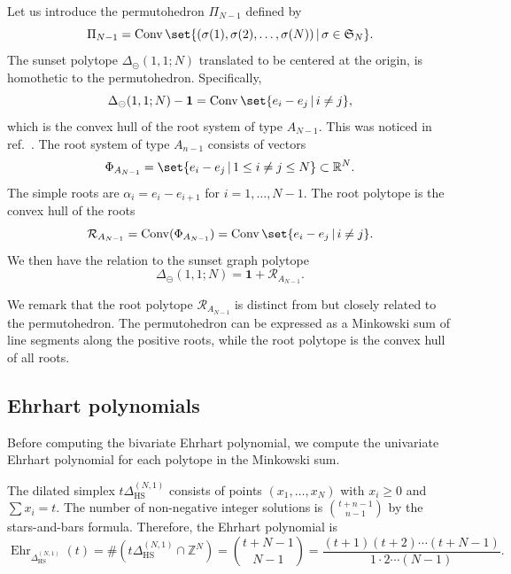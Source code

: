 \documentclass[12pt,a4paper]{article}
\theoremstyle{plain}
\theoremstyle{remark}
\newcommand{\nprops}{N}
\newcommand{\Conv}{\operatorname{Conv}}
\newcommand{\Newton}{\Delta}
\DeclareMathOperator{\ehr}{Ehr}
\newcommand{\simplexwithpars}[1]{\Newton_{\text{HS}}^{(#1)}}
\begin{document}
Let us introduce the permutohedron $\Pi_{\nprops-1}$ defined by~\cite{postnikov2005}
\begin{equation}
\Pi_{\nprops-1} = \Conv \set{(\sigma(1), \sigma(2), \ldots, \sigma(\nprops)) \, | \, \sigma
\in \mathfrak S_{\nprops}}.
\end{equation}
The sunset polytope $\Delta_{\circleddash}(1,1;\nprops)$ translated to be centered at the origin, is homothetic to the permutohedron. Specifically,
\begin{equation}
\Delta_{\circleddash}(1,1;\nprops) - \mathbf{1} = \Conv \set{e_i - e_j \, | \, i \neq j},
\end{equation}
which is the convex hull of the root system of type $A_{\nprops-1}$. This
was noticed in ref.~\cite{verrill1996root}.
The root system of type $A_{n-1}$ consists of vectors
\begin{equation}
\Phi_{A_{\nprops-1}} = \set{e_i - e_j \, | \, 1 \leq i \neq j \leq \nprops} \subset
\mathbb R^\nprops.
\end{equation}
The simple roots are $\alpha_i = e_i - e_{i+1}$ for $i = 1, \ldots, \nprops-1$.
The root polytope is the convex hull of the roots
\begin{equation}\label{e:RootAnpolytope}
\mathcal{R}_{A_{\nprops-1}} = \Conv(\Phi_{A_{\nprops-1}}) = \Conv \set{e_i - e_j \, | \, i \neq j}.
\end{equation}
We then have the relation to the sunset graph polytope
\begin{equation}
\Delta_{\circleddash}(1,1;\nprops) = \mathbf{1} + \mathcal{R}_{A_{\nprops-1}}.
\end{equation}


We remark that the root polytope $\mathcal{R}_{A_{\nprops-1}}$ is distinct from but closely related to the permutohedron. The permutohedron can be expressed as a Minkowski sum of line segments along the positive roots, while the root polytope is the convex hull of all roots.



\subsection{Ehrhart polynomials}



Before computing the bivariate Ehrhart polynomial, we compute the univariate Ehrhart polynomial for each polytope in the Minkowski sum.

The dilated simplex $t\simplexwithpars{\nprops,1}$ consists of points $(x_1, \ldots, x_\nprops)$ with $x_i \geq 0$ and $\sum x_i = t$. The number of non-negative integer solutions is $\binom{t+n-1}{n-1}$ by the stars-and-bars formula.
Therefore, the Ehrhart polynomial is~\cite{Beck:2015}
\begin{equation}
\ehr_{\simplexwithpars{\nprops,1}}(t) =\#\left(t\simplexwithpars{\nprops,1} \cap \mathbb Z^\nprops\right) = \binom{t + \nprops - 1}{\nprops - 1} = \frac{(t+1)(t+2)\cdots(t+\nprops-1)}{1 \cdot 2\cdots (\nprops-1)}.
\end{equation}
\end{document}
